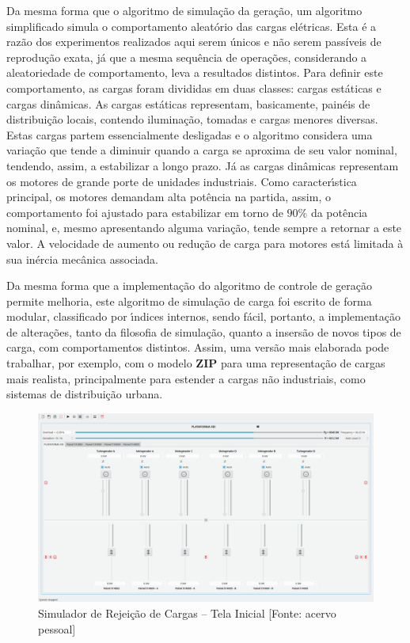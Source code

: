 Da mesma forma que o algoritmo de simula{\c c}{\~a}o da gera{\c c}{\~a}o, um algoritmo simplificado simula o comportamento aleat{\'o}rio das cargas el{\'e}tricas. Esta {\'e} a raz{\~a}o dos experimentos realizados aqui serem {\'u}nicos e n{\~a}o serem pass{\'i}veis de reprodu{\c c}{\~a}o exata, j{\'a} que a mesma sequ{\^e}ncia de opera{\c c}{\~o}es, considerando a aleatoriedade de comportamento, leva a resultados distintos. Para definir este comportamento, as cargas foram divididas em duas classes: cargas est{\'a}ticas e cargas din{\^a}micas. As cargas est{\'a}ticas representam, basicamente, pain{\'e}is de distribui{\c c}{\~a}o locais, contendo ilumina{\c c}{\~a}o, tomadas e cargas menores diversas. Estas cargas partem essencialmente desligadas e o algoritmo considera uma varia{\c c}{\~a}o que tende a diminuir quando a carga se aproxima de seu valor nominal, tendendo, assim, a estabilizar a longo prazo. J{\'a} as cargas din{\^a}micas representam os motores de grande porte de unidades industriais. Como caracter{\'\i}stica principal, os motores demandam alta pot{\^e}ncia na partida, assim, o comportamento foi ajustado para estabilizar em torno de $90\%$ da pot{\^e}ncia nominal, e, mesmo apresentando alguma varia{\c c}{\~a}o, tende sempre a retornar a este valor. A velocidade de aumento ou redu{\c c}{\~a}o de carga para motores est{\'a} limitada {\`a} sua in{\'e}rcia mec{\^a}nica associada.

Da mesma forma que a implementa{\c c}{\~a}o do algoritmo de controle de gera{\c c}{\~a}o permite melhoria, este algoritmo de simula{\c c}{\~a}o de carga foi escrito de forma modular, classificado por {\'\i}ndices internos, sendo f{\'a}cil, portanto, a implementa{\c c}{\~a}o de altera{\c c}{\~o}es, tanto da filosofia de simula{\c c}{\~a}o, quanto a insers{\~a}o de novos tipos de carga, com comportamentos distintos. Assim, uma vers{\~a}o mais elaborada pode trabalhar, por exemplo, com o modelo \textbf{ZIP} \cite{guimaraessistemas} para uma representa{\c c}{\~a}o de cargas mais realista, principalmente para estender a cargas n{\~a}o industriais, como sistemas de distribui{\c c}{\~a}o urbana.

\begin{figure}
	\centering
	\includegraphics[width=\linewidth]{figuras/simulator}
	\caption[Simulador de Rejei{\c c}{\~a}o de Cargas \---  Tela Inicial]{Simulador de Rejei{\c c}{\~a}o de Cargas \--- Tela Inicial [Fonte: acervo pessoal]}
	\label{fig:sim}
\end{figure}

